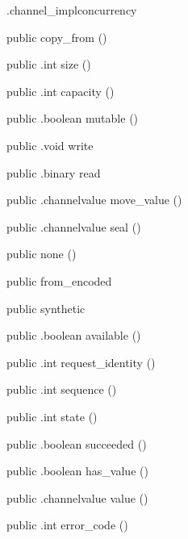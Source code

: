 \begin{CrexxClass}{.channel\_impl}{concurrency}
\begin{Members}
    \Factory
      {public}
      {copy\_from}
      {()}

    \Method
      {public}
      {.int}
      {size}
      {()}

    \Method
      {public}
      {.int}
      {capacity}
      {()}

    \Method
      {public}
      {.boolean}
      {mutable}
      {()}

    \Method
      {public}
      {.void}
      {write}
      {}

    \Method
      {public}
      {.binary}
      {read}
      {}

    \Method
      {public}
      {.channelvalue}
      {move\_value}
      {()}

    \Method
      {public}
      {.channelvalue}
      {seal}
      {()}

    \Factory
      {public}
      {none}
      {()}

    \Factory
      {public}
      {from\_encoded}
      {}

    \Factory
      {public}
      {synthetic}
      {}

    \Method
      {public}
      {.boolean}
      {available}
      {()}

    \Method
      {public}
      {.int}
      {request\_identity}
      {()}

    \Method
      {public}
      {.int}
      {sequence}
      {()}

    \Method
      {public}
      {.int}
      {state}
      {()}

    \Method
      {public}
      {.boolean}
      {succeeded}
      {()}

    \Method
      {public}
      {.boolean}
      {has\_value}
      {()}

    \Method
      {public}
      {.channelvalue}
      {value}
      {()}

    \Method
      {public}
      {.int}
      {error\_code}
      {()}


\end{Members}
\end{CrexxClass}
